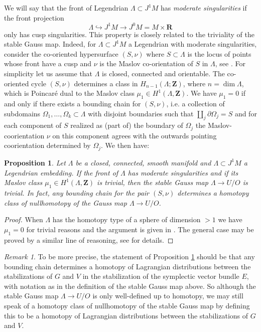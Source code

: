 \documentclass{amsart}
\def\bR{\mathbf{R}}
\def\bZ{\mathbf{Z}}
\newtheorem{proposition}[theorem]{Proposition}
\theoremstyle{definition}
\theoremstyle{remark}
\newtheorem{inductive lemma}[theorem]{Inductive Lemma}
\newtheorem{remark}[theorem]{Remark}
\begin{document}
We will say that the front of Legendrian $\Lambda \subset J^1M$ has {\em moderate singularities} if the front projection $$\Lambda \hookrightarrow J^1M \to J^0M = M \times \bR$$ only has cusp singularities. This property is closely related to the triviality of the stable Gauss map. Indeed, for $\Lambda \subset J^1M$ a Legendrian with moderate singularities, consider the co-oriented hypersurface $(S,\nu)$ where $S \subset \Lambda$ is the locus of points whose front have a cusp and $\nu$ is the Maslov co-orientation of $S$ in $\Lambda$, see \cite{A}. For simplicity let us assume that $\Lambda$ is closed, connected and orientable. The co-oriented cycle $(S,\nu)$ determines a class in $H_{n-1}(\Lambda;\bZ)$, where $n=\dim \Lambda$, which is Poincar\'e dual to the Maslov class $\mu_1 \in H^1(\Lambda,\bZ)$. We have $\mu_1=0$ if and only if there exists a bounding chain for $(S,\nu)$, i.e. a collection of subdomains $\Omega_1, \ldots, \Omega_k \subset \Lambda$ with disjoint boundaries such that $\coprod_j \partial \Omega_j = S$ and for each component of $S$ realized as (part of) the boundary of $\Omega_j$ the Maslov-coorientation $\nu$ on this component agrees with the outwards pointing coorientation determined by $\Omega_j$. We then have:

\begin{proposition}\label{prop: simp stab triv}
Let $\Lambda$ be a closed, connected, smooth manifold and $\Lambda \subset J^1M$ a Legendrian embedding. If the front of $\Lambda$ has moderate singularities and if its Maslov class $\mu_1 \in H^1(\Lambda,\bZ)$ is trivial, then the stable Gauss map $\Lambda \to U/O$ is trivial. In fact, any bounding chain for the pair $(S,\nu)$ determines a homotopy class of nullhomotopy of the Gauss map $\Lambda \to U/O$. \end{proposition} 

\begin{proof}
When $\Lambda$ has the homotopy type of a sphere of dimension $>1$ we have $\mu_1=0$ for trivial reasons and the argument is given in \cite{AD22}. The general case may be proved by a similar line of reasoning, see \cite{B27} for details. \end{proof}

\begin{remark}
To be more precise, the statement of Proposition \ref{prop: simp stab triv} should be that any bounding chain determines a homotopy of Lagrangian distributions between the stabilizations of $G$ and $V$ in the stabilization of the symplectic vector bundle $E$, with notation as in the definition of the stable Gauss map above. So although the stable Gauss map $\Lambda \to U/O$ is only well-defined up to homotopy, we may still speak of a homotopy class of nullhomotopy of the stable Gauss map by defining this to be a homotopy of Lagrangian distributions between the stabilizations of $G$ and $V$. 
\end{remark}
\end{document}

